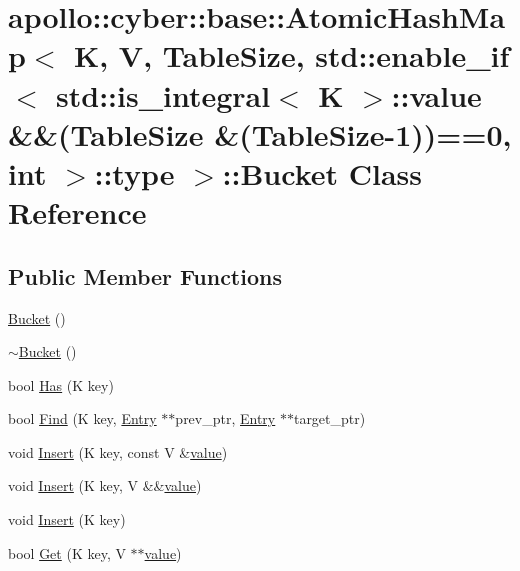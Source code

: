 \hypertarget{classapollo_1_1cyber_1_1base_1_1AtomicHashMap_1_1Bucket}{\section{apollo\-:\-:cyber\-:\-:base\-:\-:Atomic\-Hash\-Map$<$ K, V, Table\-Size, std\-:\-:enable\-\_\-if$<$ std\-:\-:is\-\_\-integral$<$ K $>$\-:\-:value \&\&(Table\-Size \&(Table\-Size-\/1))==0, int $>$\-:\-:type $>$\-:\-:Bucket Class Reference}
\label{classapollo_1_1cyber_1_1base_1_1AtomicHashMap_1_1Bucket}
}
\subsection*{Public Member Functions}
\begin{DoxyCompactItemize}
\item 
\hyperlink{classapollo_1_1cyber_1_1base_1_1AtomicHashMap_1_1Bucket_a6d7968e613f57c1f45c687e937002def}{Bucket} ()
\item 
\hyperlink{classapollo_1_1cyber_1_1base_1_1AtomicHashMap_1_1Bucket_ab8588807dff84dee88f5a7ee18724d4c}{$\sim$\-Bucket} ()
\item 
bool \hyperlink{classapollo_1_1cyber_1_1base_1_1AtomicHashMap_1_1Bucket_a2d8891754500ca4192856a7f7614829a}{Has} (K key)
\item 
bool \hyperlink{classapollo_1_1cyber_1_1base_1_1AtomicHashMap_1_1Bucket_ac221662e95bf2d7c5589cab2766cd788}{Find} (K key, \hyperlink{structapollo_1_1cyber_1_1base_1_1AtomicHashMap_1_1Entry}{Entry} $\ast$$\ast$prev\-\_\-ptr, \hyperlink{structapollo_1_1cyber_1_1base_1_1AtomicHashMap_1_1Entry}{Entry} $\ast$$\ast$target\-\_\-ptr)
\item 
void \hyperlink{classapollo_1_1cyber_1_1base_1_1AtomicHashMap_1_1Bucket_aa3cba2cbce1ff70d05aeee20b85ef496}{Insert} (K key, const V \&\hyperlink{namespaceapollo_1_1cyber_1_1base_aa3e2fff9b18a1214af4a70546fb7120f}{value})
\item 
void \hyperlink{classapollo_1_1cyber_1_1base_1_1AtomicHashMap_1_1Bucket_a54408f179b728a7e7928443d57a034dc}{Insert} (K key, V \&\&\hyperlink{namespaceapollo_1_1cyber_1_1base_aa3e2fff9b18a1214af4a70546fb7120f}{value})
\item 
void \hyperlink{classapollo_1_1cyber_1_1base_1_1AtomicHashMap_1_1Bucket_ae363c6757f59ff0031776577e4bb7c03}{Insert} (K key)
\item 
bool \hyperlink{classapollo_1_1cyber_1_1base_1_1AtomicHashMap_1_1Bucket_a0de1875c51ca5d8692e8055f5da7d54c}{Get} (K key, V $\ast$$\ast$\hyperlink{namespaceapollo_1_1cyber_1_1base_aa3e2fff9b18a1214af4a70546fb7120f}{value})
\end{DoxyCompactItemize}
